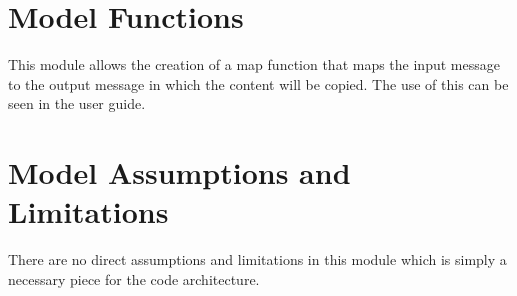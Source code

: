 \section{Model Functions}

This module allows the creation of a map function that maps the input message to the output message in which the content will be copied.
The use of this can be seen in the user guide.

\section{Model Assumptions and Limitations}

There are no direct assumptions and limitations in this module which is simply a necessary piece for the code architecture. 